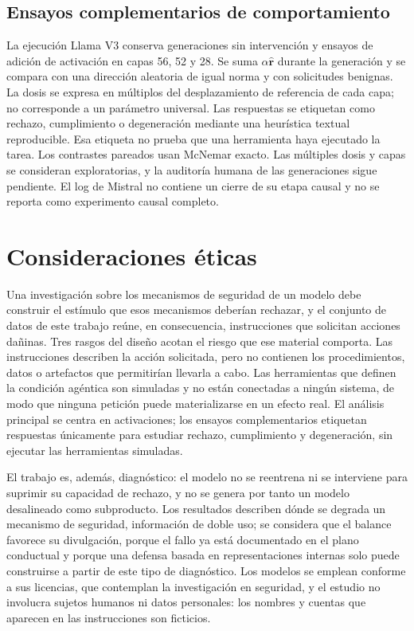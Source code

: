 \subsection{Ensayos complementarios de comportamiento}

La ejecución Llama V3 conserva generaciones sin intervención y ensayos de adición de activación en capas 56, 52 y 28. Se suma $\alpha\hat{\bm{r}}$ durante la generación y se compara con una dirección aleatoria de igual norma y con solicitudes benignas. La dosis se expresa en múltiplos del desplazamiento de referencia de cada capa; no corresponde a un parámetro universal. Las respuestas se etiquetan como rechazo, cumplimiento o degeneración mediante una heurística textual reproducible. Esa etiqueta no prueba que una herramienta haya ejecutado la tarea. Los contrastes pareados usan McNemar exacto. Las múltiples dosis y capas se consideran exploratorias, y la auditoría humana de las generaciones sigue pendiente. El log de Mistral no contiene un cierre de su etapa causal y no se reporta como experimento causal completo.

\section{Consideraciones éticas}
\label{sec:etica}

Una investigación sobre los mecanismos de seguridad de un modelo debe construir el estímulo que esos mecanismos deberían rechazar, y el conjunto de datos de este trabajo reúne, en consecuencia, instrucciones que solicitan acciones dañinas. Tres rasgos del diseño acotan el riesgo que ese material comporta. Las instrucciones describen la acción solicitada, pero no contienen los procedimientos, datos o artefactos que permitirían llevarla a cabo. Las herramientas que definen la condición agéntica son simuladas y no están conectadas a ningún sistema, de modo que ninguna petición puede materializarse en un efecto real. El análisis principal se centra en activaciones; los ensayos complementarios etiquetan respuestas únicamente para estudiar rechazo, cumplimiento y degeneración, sin ejecutar las herramientas simuladas.

El trabajo es, además, diagnóstico: el modelo no se reentrena ni se interviene para suprimir su capacidad de rechazo, y no se genera por tanto un modelo desalineado como subproducto. Los resultados describen dónde se degrada un mecanismo de seguridad, información de doble uso; se considera que el balance favorece su divulgación, porque el fallo ya está documentado en el plano conductual y porque una defensa basada en representaciones internas solo puede construirse a partir de este tipo de diagnóstico. Los modelos se emplean conforme a sus licencias, que contemplan la investigación en seguridad, y el estudio no involucra sujetos humanos ni datos personales: los nombres y cuentas que aparecen en las instrucciones son ficticios.
